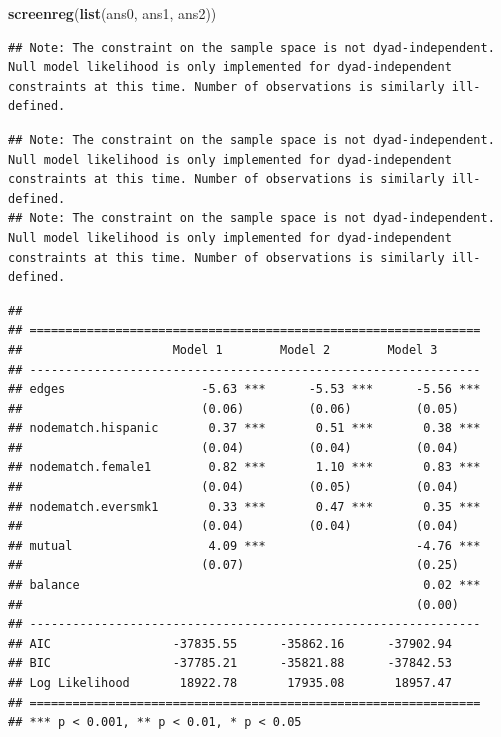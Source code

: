 \documentclass[]{book}
\newenvironment{Shaded}{\begin{snugshade}}{\end{snugshade}}
\newcommand{\KeywordTok}[1]{\textcolor[rgb]{0.13,0.29,0.53}{\textbf{#1}}}
\newcommand{\NormalTok}[1]{#1}
\theoremstyle{definition}
\theoremstyle{definition}
\theoremstyle{definition}
\theoremstyle{remark}
\begin{document}
\begin{Shaded}
\begin{Highlighting}[]
\KeywordTok{screenreg}\NormalTok{(}\KeywordTok{list}\NormalTok{(ans0, ans1, ans2))}
\end{Highlighting}
\end{Shaded}

\begin{verbatim}
## Note: The constraint on the sample space is not dyad-independent. Null model likelihood is only implemented for dyad-independent constraints at this time. Number of observations is similarly ill-defined.
\end{verbatim}

\begin{verbatim}
## Note: The constraint on the sample space is not dyad-independent. Null model likelihood is only implemented for dyad-independent constraints at this time. Number of observations is similarly ill-defined.
## Note: The constraint on the sample space is not dyad-independent. Null model likelihood is only implemented for dyad-independent constraints at this time. Number of observations is similarly ill-defined.
\end{verbatim}

\begin{verbatim}
## 
## ===============================================================
##                     Model 1        Model 2        Model 3      
## ---------------------------------------------------------------
## edges                   -5.63 ***      -5.53 ***      -5.56 ***
##                         (0.06)         (0.06)         (0.05)   
## nodematch.hispanic       0.37 ***       0.51 ***       0.38 ***
##                         (0.04)         (0.04)         (0.04)   
## nodematch.female1        0.82 ***       1.10 ***       0.83 ***
##                         (0.04)         (0.05)         (0.04)   
## nodematch.eversmk1       0.33 ***       0.47 ***       0.35 ***
##                         (0.04)         (0.04)         (0.04)   
## mutual                   4.09 ***                     -4.76 ***
##                         (0.07)                        (0.25)   
## balance                                                0.02 ***
##                                                       (0.00)   
## ---------------------------------------------------------------
## AIC                 -37835.55      -35862.16      -37902.94    
## BIC                 -37785.21      -35821.88      -37842.53    
## Log Likelihood       18922.78       17935.08       18957.47    
## ===============================================================
## *** p < 0.001, ** p < 0.01, * p < 0.05
\end{verbatim}
\end{document}
